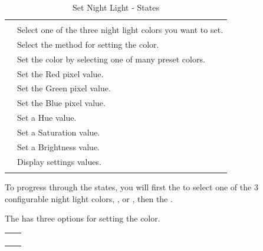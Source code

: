 \begin{table}[H]
\centering
\begin{tabu}{ X[1,c,m] | X[3,l,m] }
  \thrule
   &  \\ \mrule

   & Select one of the three night light colors
    you want to set. \\ 
   & Select the method for setting the color. \\ 
   & Set the color by selecting one of many
    preset colors. \\ 
   & Set the Red pixel value. \\ 
   & Set the Green pixel value. \\ 
   & Set the Blue pixel value. \\ 
   & Set a Hue value. \\ 
   & Set a Saturation value. \\ 
   & Set a Brightness value. \\ 
   & Display settings values. \\
  \bhrule
\end{tabu}
\caption{Set Night Light - States}
\end{table}

To progress through the states, you will first  the  to select
one of the \num{3} configurable night light colors, ,  or
, then  the .


The  has three options for setting the color.

\begin{table}[H]
\centering
\begin{tabu} { c c }
   &  \\ \mrule
   &  \\
   &  \\
   &  \\
\end{tabu}
\end{table}

